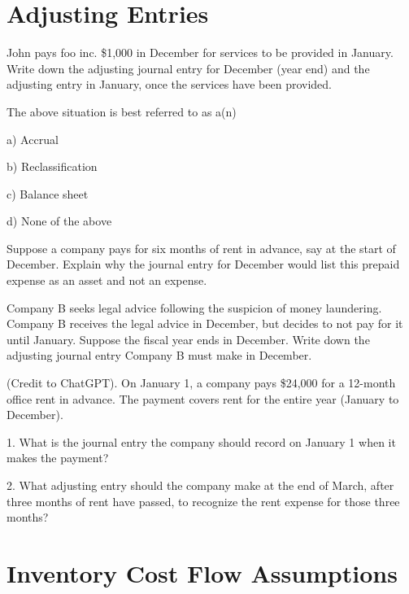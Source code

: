 \documentclass{scrartcl}
\begin{document}
\section{Adjusting Entries}

John pays foo inc. \$1,000 in December for services to be provided in
January. Write down the adjusting journal entry for December (year end)
and the adjusting entry in January, once the services have been 
provided. 

\vspace{10em}

The above situation is best referred to as a(n)

a) Accrual

b) Reclassification

c) Balance sheet

d) None of the above

\vspace{10em}

Suppose a company pays for six months of rent in advance, say at the
start of December. Explain why the journal entry for December would 
list this prepaid expense as an asset and not an expense. 
    
\vspace{10em}

Company B seeks legal advice following the suspicion of money laundering.
Company B receives the legal advice in December, but decides to not 
pay for it until January. Suppose the fiscal year ends in December. 
Write down the adjusting journal entry Company B must make in December.

\vspace{10em}

(Credit to ChatGPT). On January 1, a company pays \$24,000 for a 
12-month office rent in advance. The payment covers rent for the entire
year (January to December). 

1. What is the journal entry the company should record on January 1
when it makes the payment?

2. What adjusting entry should the company make at the end of March,
after three months of rent have passed, to recognize the rent expense
for those three months?

\vspace{10em}

\section{Inventory Cost Flow Assumptions}
\end{document}
